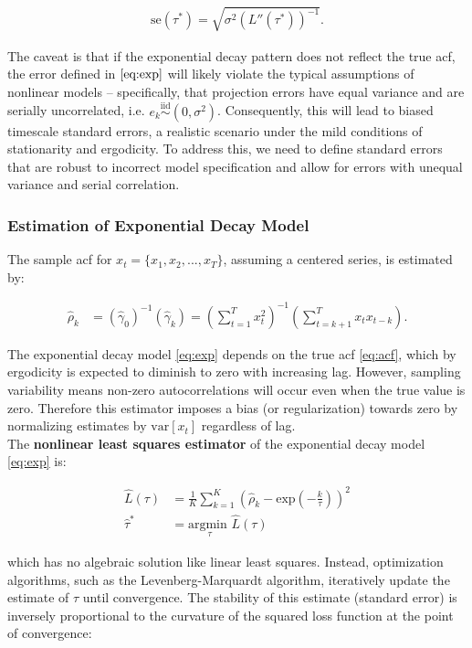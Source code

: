 \documentclass[main.tex]{subfiles}
\begin{document}
\begin{align}\label{eq:exp-se-tau}
   \text{se}(\tau^*) = \sqrt{\sigma^2 (L''(\tau^*))^{-1}}. 
\end{align}

The caveat is that if the exponential decay pattern does not reflect the true acf, the error defined in $\eqref{eq:exp}$ will likely violate the typical assumptions of nonlinear models -- specifically, that projection errors have equal variance and are serially uncorrelated, i.e. $e_k \overset{\text{iid}}{\sim} (0, \sigma^2)$. Consequently, this will lead to biased timescale standard errors, a realistic scenario under the mild conditions of stationarity and ergodicity. To address this, we need to define standard errors that are robust to incorrect model specification and allow for errors with unequal variance and serial correlation.

\subsubsection{Estimation of Exponential Decay Model}
The sample acf for $x_t = \{x_1, x_2, ..., x_T\}$, assuming a centered series, is estimated by:

\begin{align}\label{eq:acf_}
\hat\rho_k &= (\hat\gamma_0)^{-1}(\hat\gamma_k) = (\sum_{t=1}^T x_t^2)^{-1} (\sum_{t=k+1}^{T}x_t x_{t-k}).
\end{align}

The exponential decay model \eqref{eq:exp} depends on the true acf \eqref{eq:acf}, which by ergodicity is expected to diminish to zero with increasing lag. However, sampling variability means non-zero autocorrelations will occur even when the true value is zero. Therefore this estimator imposes a bias (or regularization) towards zero by normalizing estimates by $\text{var}[x_t]$ regardless of lag.\\

The \textbf{nonlinear least squares estimator} of the exponential decay model \eqref{eq:exp} is:

\begin{align}
    \hat L(\tau) &= \frac{1}{K} \sum_{k=1}^K (\hat\rho_k - \text{exp}(-\frac{k}{\tau}))^2\\
    \hat\tau^* &= \underset{\tau}{\text{argmin }} \hat L(\tau) \label{eq:exp-tau}
\end{align}

which has no algebraic solution like linear least squares. Instead, optimization algorithms, such as the  Levenberg-Marquardt \cite{watson_levenberg-marquardt_1978} algorithm, iteratively update the estimate of $\tau$ until convergence. The stability of this estimate (standard error) is inversely proportional to the curvature of the squared loss function at the point of convergence:
\end{document}
